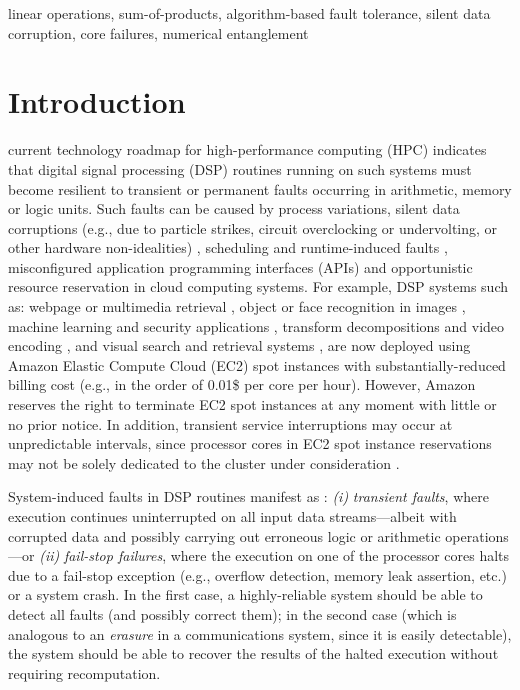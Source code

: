 \documentclass[twocolumn,english,onecolumn]{IEEEtran}
\theoremstyle{plain}
\theoremstyle{plain}
\begin{document}
\begin{IEEEkeywords}
linear operations, sum-of-products, algorithm-based fault tolerance,
silent data corruption, core failures, numerical entanglement
\end{IEEEkeywords}


\section{Introduction}

 current technology roadmap for high-performance
computing (HPC) indicates that digital signal processing (DSP) routines
running on such systems must become resilient to transient or permanent
faults occurring in arithmetic, memory or logic units. Such faults
can be caused by process variations, silent data corruptions (e.g.,
due to particle strikes, circuit overclocking or undervolting, or
other hardware non-idealities) \cite{nicolaidis2012design}, scheduling
and runtime-induced faults \cite{AndreopoulosTMM_PlentyOfRoom}, misconfigured
application programming interfaces (APIs) \cite{lu2013cloud} and
opportunistic resource reservation \cite{poola2014fault} in cloud
computing systems. For example, DSP systems such as: webpage or multimedia
retrieval \cite{carterette2009million}, object or face recognition
in images \cite{yang2004two}, machine learning and security applications
\cite{bradski2008learning}, transform decompositions and video encoding
\cite{andreopoulos2000hybrid,andreopoulos2002new,andreopoulos2001local,munteanu2003control,andreopoulos2003high,andreopoulos2007adaptive,kontorinis2009statistical,foo2008analytical,barbarien2004scalable},
and visual search and retrieval systems \cite{jegou2012aggregating},
are now deployed using Amazon Elastic Compute Cloud (EC2) spot instances
with substantially-reduced billing cost (e.g., in the order of 0.01\$
per core per hour). However, Amazon reserves the right to terminate
EC2 spot instances at any moment with little or no prior notice. In
addition, transient service interruptions may occur at unpredictable
intervals, since processor cores in EC2 spot instance reservations
may not be solely dedicated to the cluster under consideration \cite{lu2013cloud,poola2014fault}. 

System-induced faults in DSP routines manifest as \cite{nicolaidis2012design,AndreopoulosTMM_PlentyOfRoom,fiala2012detection}:
\emph{(i)} \emph{transient faults}, where execution continues uninterrupted
on all input data streams---albeit with corrupted data and possibly
carrying out erroneous logic or arithmetic operations---or \emph{(ii)}
\emph{fail-stop failures}, where the execution on one of the processor
cores halts due to a fail-stop exception (e.g., overflow detection,
memory leak assertion, etc.) or a system crash. In the first case,
a highly-reliable system should be able to detect all faults (and
possibly correct them); in the second case (which is analogous to
an \emph{erasure} in a communications system, since it is easily detectable),
the system should be able to recover the results of the halted execution
without requiring recomputation. 
\end{document}
